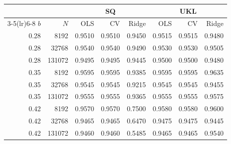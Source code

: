 \begin{tabular}{rrrrrrrr}
\toprule
 & & \multicolumn{3}{c}{SQ} & \multicolumn{3}{c}{UKL} \\
\cmidrule(lr){3-5}\cmidrule(lr){6-8}
$b$ & $N$ & OLS & CV & Ridge & OLS & CV & Ridge \\
\midrule
0.28 & 8192 & 0.9510 & 0.9510 & 0.9450 & 0.9515 & 0.9515 & 0.9480 \\
0.28 & 32768 & 0.9540 & 0.9540 & 0.9490 & 0.9530 & 0.9530 & 0.9505 \\
0.28 & 131072 & 0.9495 & 0.9495 & 0.9445 & 0.9500 & 0.9500 & 0.9480 \\
0.35 & 8192 & 0.9595 & 0.9595 & 0.9385 & 0.9595 & 0.9595 & 0.9635 \\
0.35 & 32768 & 0.9545 & 0.9545 & 0.9215 & 0.9545 & 0.9545 & 0.9455 \\
0.35 & 131072 & 0.9555 & 0.9555 & 0.9365 & 0.9555 & 0.9555 & 0.9575 \\
0.42 & 8192 & 0.9570 & 0.9570 & 0.7500 & 0.9580 & 0.9580 & 0.9600 \\
0.42 & 32768 & 0.9465 & 0.9465 & 0.6470 & 0.9475 & 0.9475 & 0.9445 \\
0.42 & 131072 & 0.9460 & 0.9460 & 0.5485 & 0.9465 & 0.9465 & 0.9540 \\
\bottomrule
\end{tabular}
